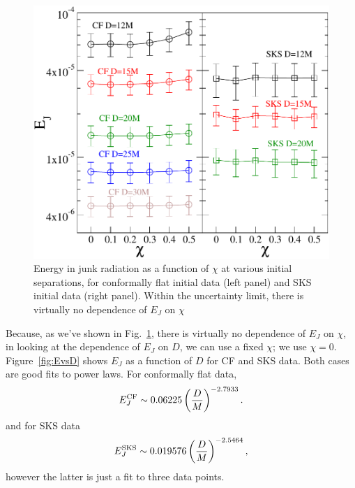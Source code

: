 \begin{figure}
\includegraphics[width=0.95\columnwidth]{chap5/EvsS}
  \caption{Energy in junk radiation as a function of $\chi$ at various
  initial separations, for conformally flat initial data (left panel)
  and SKS initial data (right panel). Within the uncertainty limit,
  there is virtually no dependence of $E_J$ on $\chi$ }
  \label{fig:EvsS}
\end{figure}

Because, as we've shown in Fig.~\ref{fig:EvsS}, there is virtually
no dependence of $E_J$ on $\chi$, in looking at the dependence of
$E_J$ on $D$, we can use a fixed $\chi$; we use
$\chi=0$. Figure~\ref{fig:EvsD} shows $E_J$ as a function of $D$ for
CF and SKS data. Both cases are good fits to power laws. For
conformally flat data,
\begin{equation}
E_J^{\rm CF}\sim 0.06225\left(\frac{D}{M}\right)^{-2.7933}.
\end{equation}
and for SKS data
\begin{equation}
E_J^{\rm SKS}\sim 0.019576\left(\frac{D}{M}\right)^{-2.5464},
\end{equation}
however the latter is just a fit to three data points.




